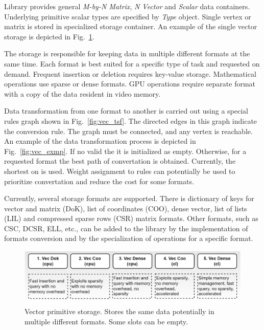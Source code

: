 Library provides general \textit{M-by-N Matrix}, \textit{N Vector} and \textit{Scalar} data containers.
Underlying primitive scalar types are specified by \textit{Type} object. 
Single vertex or matrix is stored in specialized storage container. An example of the single vector storage is depicted in Fig.~\ref{fig:vec_storage}. 

The storage is responsible for keeping data in multiple different formats at the same time. 
Each format is best suited for a specific type of task and requested on demand. 
Frequent insertion or deletion requires key-value storage. 
Mathematical operations use sparse or dense formats. 
GPU operations require separate format with a copy of the data resident in video memory.

Data transformation from one format to another is carried out using a special rules graph shown in Fig.~\ref{fig:vec_tsf}. 
The directed edges in this graph indicate the conversion rule. 
The graph must be connected, and any vertex is reachable. 
An example of the data transformation process is depicted in Fig.~\ref{fig:vec_exmp}. 
If no valid the it is initialized as empty. 
Otherwise, for a requested format the best path of convertation is obtained. Currently, the shortest on is used. 
Weight assignment to rules can potentially be used to prioritize convertation and reduce the cost for some formats. 

Currently, several storage formats are supported. 
There is dictionary of keys for vector and matrix (DoK), list of coordinates (COO), dense vector, list of lists (LIL) and compressed sparse rows (CSR) matrix formats.  
Other formats, such as CSC, DCSR, ELL, etc., can be added to the library by the implementation of formats conversion and by the specialization of operations for a specific format.

\begin{figure}[b]
\centering
\includegraphics[width=1.0\linewidth]{figures/vector_storage.png}
\caption{Vector primitive storage. Stores the same data potentially in multiple different formats. Some slots can be empty.}
\label{fig:vec_storage}
\end{figure}

